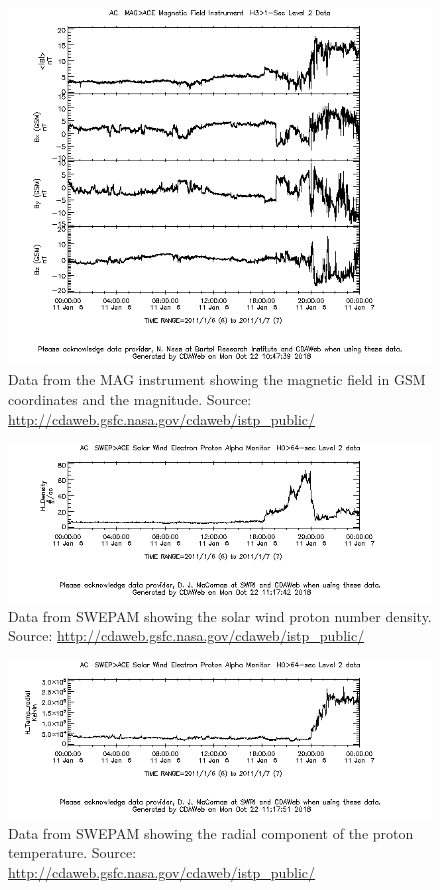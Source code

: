 \documentclass[norsk,a4paper,11pt]{article}
\begin{document}
\begin{multicols}{2}
\begin{figure}[H]
	\includegraphics[scale=0.4]{Figures/ACEmagfield2011_01_06.png}
	\centering
	\caption{Data from the MAG instrument showing the magnetic field in GSM coordinates and the magnitude. Source: \url{http://cdaweb.gsfc.nasa.gov/cdaweb/istp_public/}}
	\label{fig:ACEmag}
\end{figure}

\begin{figure}[H]
	\includegraphics[scale=0.4]{Figures/ACE_H_Density.png}
	\centering
	\caption{Data from SWEPAM showing the solar wind proton number density. Source: \url{http://cdaweb.gsfc.nasa.gov/cdaweb/istp_public/}}
	\label{fig:ACE_H_Density}
\end{figure}

\begin{figure}[H]
	\includegraphics[scale=0.4]{Figures/ACE_H_Temp_radial.png}
	\centering
	\caption{Data from SWEPAM showing the radial component of the proton temperature. Source: \url{http://cdaweb.gsfc.nasa.gov/cdaweb/istp_public/}}
	\label{fig:ACE_temp}
\end{figure}


\end{multicols}
\end{document}
